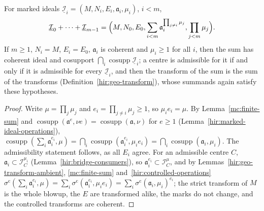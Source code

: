 \begin{definition}
\label{mc:marked-finite-sum}
\leanok
For marked ideals \(\underline{\mathcal I}_i=(M,N_i,E_i,\mathfrak a_i,\mu_i)\), \(i<m\),
\[
 \underline{\mathcal I}_0+\dots+\underline{\mathcal I}_{m-1}=\Bigl(M,N_0,E_0,\sum_{i<m}\mathfrak a_i^{\prod_{j\ne i}\mu_j},\prod_{j<m}\mu_j\Bigr).
\]
If \(m\ge1\), \(N_i=M\), \(E_i=E_0\), \(\mathfrak a_i\) is coherent and \(\mu_i\ge1\) for all \(i\), then the sum has coherent ideal and cosupport
\(\bigcap_i\operatorname{cosupp}\underline{\mathcal I}_i\); a centre is admissible for it if and only if it is admissible for every \(\underline{\mathcal I}_i\), and then the
transform of the sum is the sum of the transforms (Definition~\ref{hir:geo-transform}), whose summands again satisfy these hypotheses.
\end{definition}
\begin{proof}
\leanok
Write \(\mu=\prod_j\mu_j\) and \(e_i=\prod_{j\ne i}\mu_j\ge1\), so \(\mu_ie_i=\mu\). By Lemma~\ref{mc:finite-sum} and
\(\operatorname{cosupp}(\mathfrak a^{e},\nu e)=\operatorname{cosupp}(\mathfrak a,\nu)\) for \(e\ge1\) (Lemma~\ref{hir:marked-ideal-operations}),
\(\operatorname{cosupp}(\sum_i\mathfrak a_i^{e_i},\mu)=\bigcap_i\operatorname{cosupp}(\mathfrak a_i^{e_i},\mu_ie_i)=\bigcap_i\operatorname{cosupp}(\mathfrak a_i,\mu_i)\). The
admissibility statement follows, as all \(E_i\) agree. For an admissible centre \(C\), \(\mathfrak a_i\subset\mathcal I_C^{\mu_i}\) (Lemma~\ref{hir:bridge-consumers}), so
\(\mathfrak a_i^{e_i}\subset\mathcal I_C^{\mu}\), and by Lemmas~\ref{hir:geo-transform-ambient}, \ref{mc:finite-sum} and~\ref{hir:controlled-operations}
\(\sigma^{\mathrm c}(\sum_i\mathfrak a_i^{e_i},\mu)=\sum_i\sigma^{\mathrm c}(\mathfrak a_i^{e_i},\mu_ie_i)=\sum_i\sigma^{\mathrm c}(\mathfrak a_i,\mu_i)^{e_i}\); the strict transform of \(M\)
is the whole blowup, the \(E\) are transformed alike, the marks do not change, and the controlled transforms are coherent.
\end{proof}

